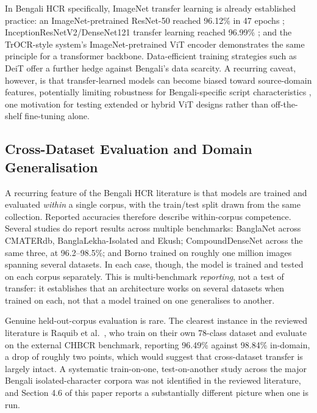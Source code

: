 In Bengali HCR specifically, ImageNet transfer learning is already
established practice: an ImageNet-pretrained ResNet-50 reached 96.12\%
in 47 epochs \citep{ref11}; InceptionResNetV2/DenseNet121 transfer
learning reached 96.99\% \citep{ref12}; and the TrOCR-style system's
ImageNet-pretrained ViT encoder \citep{ref21} demonstrates the same
principle for a transformer backbone. Data-efficient training
strategies such as DeiT \citep{ref41} offer a further hedge against
Bengali's data scarcity. A recurring caveat, however, is that
transfer-learned models can become biased toward source-domain
features, potentially limiting robustness for Bengali-specific script
characteristics \citep{ref17}, one motivation for testing extended or hybrid ViT designs rather than off-the-shelf fine-tuning alone.

\hypertarget{cross-dataset-evaluation-and-domain-generalisation}{%
\subsection{Cross-Dataset Evaluation and Domain
Generalisation}\label{cross-dataset-evaluation-and-domain-generalisation}}

A recurring feature of the Bengali HCR literature is that models are
trained and evaluated \emph{within} a single corpus, with the
train/test split drawn from the same collection. Reported accuracies
therefore describe within-corpus competence. Several studies do report
results across multiple benchmarks: BanglaNet \citep{ref35} across
CMATERdb, BanglaLekha-Isolated and Ekush; CompoundDenseNet \citep{ref23}
across the same three, at 96.2--98.5\%; and Borno \citep{ref15} trained on
roughly one million images spanning several datasets. In each
case, though, the model is trained and tested on each corpus separately. This is
multi-benchmark \emph{reporting}, not a test of transfer: it establishes
that an architecture works on several datasets when trained on each, not
that a model trained on one generalises to another.

Genuine held-out-corpus evaluation is rare. The clearest instance in the
reviewed literature is Raquib et al.~\citeyearpar{ref25}, who train on their own
78-class dataset and evaluate on the external CHBCR benchmark, reporting
96.49\% against 98.84\% in-domain, a drop of roughly two points,
which would suggest that cross-dataset transfer is largely intact. A
systematic train-on-one, test-on-another study across
the major Bengali isolated-character corpora was not identified in the reviewed literature, and Section 4.6 of this
paper reports a substantially different picture when one is run.

